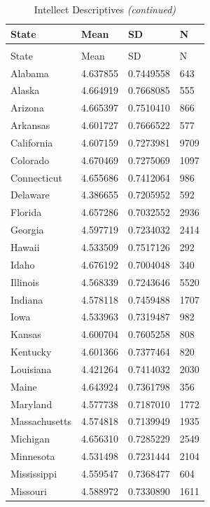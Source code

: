 \documentclass[
  english,
  man]{apa6}
\begin{document}
\begin{landscape}
\begin{longtable}[t]{llll}
\caption{\label{tab:KableOuput}Intellect Descriptives}\\
\toprule
State & Mean & SD & N\\
\midrule
\endfirsthead
\caption[]{\label{tab:KableOuput}Intellect Descriptives \textit{(continued)}}\\
\toprule
State & Mean & SD & N\\
\midrule
\endhead

\endfoot
\bottomrule
\endlastfoot
Alabama & 4.637855 & 0.7449558 & 643\\
Alaska & 4.664919 & 0.7668085 & 555\\
Arizona & 4.665397 & 0.7510410 & 866\\
Arkansas & 4.601727 & 0.7666522 & 577\\
California & 4.607159 & 0.7273981 & 9709\\
\addlinespace
Colorado & 4.670469 & 0.7275069 & 1097\\
Connecticut & 4.655686 & 0.7412064 & 986\\
Delaware & 4.386655 & 0.7205952 & 592\\
Florida & 4.657286 & 0.7032552 & 2936\\
Georgia & 4.597719 & 0.7234032 & 2414\\
\addlinespace
Hawaii & 4.533509 & 0.7517126 & 292\\
Idaho & 4.676192 & 0.7004048 & 340\\
Illinois & 4.568339 & 0.7243646 & 5520\\
Indiana & 4.578118 & 0.7459488 & 1707\\
Iowa & 4.533963 & 0.7319487 & 982\\
\addlinespace
Kansas & 4.600704 & 0.7605258 & 808\\
Kentucky & 4.601366 & 0.7377464 & 820\\
Louisiana & 4.421264 & 0.7414032 & 2030\\
Maine & 4.643924 & 0.7361798 & 356\\
Maryland & 4.577738 & 0.7187010 & 1772\\
\addlinespace
Massachusetts & 4.574818 & 0.7139949 & 1935\\
Michigan & 4.656310 & 0.7285229 & 2549\\
Minnesota & 4.531498 & 0.7231444 & 2104\\
Mississippi & 4.559547 & 0.7368477 & 604\\
Missouri & 4.588972 & 0.7330890 & 1611\\

\end{longtable}
\end{landscape}
\end{document}
